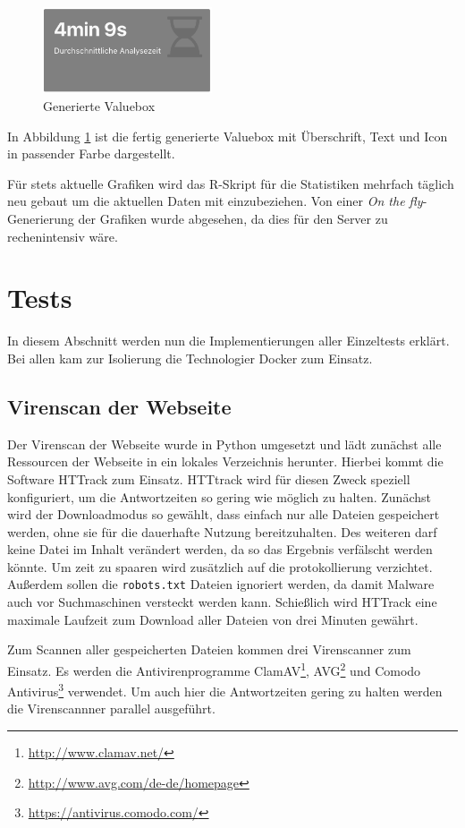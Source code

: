\begin{figure}[H]
  \centering
  \includegraphics[width=5cm]{images/stats/valuebox}
  \caption{Generierte Valuebox}
  \label{fig:valuebox}
\end{figure}

In Abbildung \ref{fig:valuebox} ist die fertig generierte Valuebox mit Überschrift, Text und Icon in passender Farbe dargestellt.

Für stets aktuelle Grafiken wird das R-Skript für die Statistiken mehrfach täglich neu gebaut um die aktuellen Daten mit einzubeziehen. Von einer \textit{On the fly}-Generierung der Grafiken wurde abgesehen, da dies für den Server zu rechenintensiv wäre.

\section{Tests}

In diesem Abschnitt werden nun die Implementierungen aller Einzeltests erklärt. Bei allen kam zur Isolierung die Technologier Docker zum Einsatz.

\subsection{Virenscan der Webseite}

Der Virenscan der Webseite wurde in Python umgesetzt und lädt zunächst alle Ressourcen der Webseite in ein lokales Verzeichnis herunter. Hierbei kommt die Software HTTrack zum Einsatz. HTTtrack wird für diesen Zweck speziell konfiguriert, um die Antwortzeiten so gering wie möglich zu halten. Zunächst wird der Downloadmodus so gewählt, dass einfach nur alle Dateien gespeichert werden, ohne sie für die dauerhafte Nutzung bereitzuhalten. Des weiteren darf keine Datei im Inhalt verändert werden, da so das Ergebnis verfälscht werden könnte. Um zeit zu spaaren wird zusätzlich auf die protokollierung verzichtet. Außerdem sollen die \lstinline[style=eclipse]{robots.txt} Dateien ignoriert werden, da damit Malware auch vor Suchmaschinen versteckt werden kann. Schießlich wird HTTrack eine maximale Laufzeit zum Download aller Dateien von drei Minuten gewährt.

Zum Scannen aller gespeicherten Dateien kommen drei Virenscanner zum Einsatz. Es werden die Antivirenprogramme ClamAV\footnote{\url{http://www.clamav.net/}}, AVG\footnote{\url{http://www.avg.com/de-de/homepage}} und Comodo Antivirus\footnote{\url{https://antivirus.comodo.com/}} verwendet. Um auch hier die Antwortzeiten gering zu halten werden die Virenscannner parallel ausgeführt.

